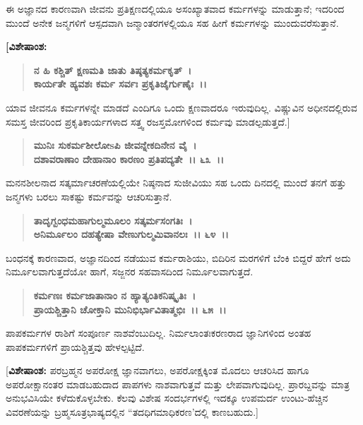 ಈ ಅಜ್ಞಾನದ ಕಾರಣವಾಗಿ ಜೀವನು ಪ್ರತಿಕ್ಷಣದಲ್ಲಿಯೂ ಅಸಂಖ್ಯಾತವಾದ ಕರ್ಮಗಳನ್ನು ಮಾಡುತ್ತಾನೆ; ಇದರಿಂದ ಮುಂದೆ ಅನೇಕ ಜನ್ಮಗಳಿಗೆ ಆಸ್ಪದವಾಗಿ ಜನ್ಮಾಂತರಗಳಲ್ಲಿಯೂ ಸಹ ಹೀಗೆ ಕರ್ಮಗಳನ್ನು ಮುಂದುವರೆಸುತ್ತಾನೆ.

\begin{flushleft}
\textbf{[ವಿಶೇಷಾಂಶ:}
\end{flushleft}

\begin{verse}
\textbf{ನ ಹಿ ಕಶ್ಚಿತ್ ಕ್ಷಣಮತಿ ಜಾತು ತಿಷ್ಠತ್ಯಕರ್ಮಕೃತ್~।}\\\textbf{ಕಾರ್ಯತೇ ಹ್ಯವಶಃ ಕರ್ಮ ಸರ್ವಃ ಪ್ರಕೃತಿಜೈರ್ಗುಣೈಃ~।।}  
\end{verse}

ಯಾವ ಜೀವನೂ ಕರ್ಮಗಳನ್ನೇ ಮಾಡದೆ ಎಂದಿಗೂ ಒಂದು ಕ್ಷಣವಾದರೂ ಇರುವುದಿಲ್ಲ. ವಿಷ್ಣುವಿನ ಅಧೀನದಲ್ಲಿರುವ ಸಮಸ್ತ ಜೀವರಿಂದ ಪ್ರಕೃತಿಕಾರ್ಯಗಳಾದ ಸತ್ತ್ವ ರಜಸ್ತಮೋಗಳಿಂದ ಕರ್ಮವು ಮಾಡಲ್ಪಡುತ್ತದೆ.]

\begin{verse}
\textbf{ಮುನಿಃ ಸುಕರ್ಮಶೀಲೋsಪಿ ಜೀವನ್ನೇಕದಿನೇನ ವೈ~।}\\\textbf{ದಶಾವರಾಣಾಂ ದೇಹಾನಾಂ ಕಾರಣಂ ಪ್ರತಿಪದ್ಯತೇ~।। ೬೩~।।}
\end{verse}

ಮನನಶೀಲನಾದ ಸತ್ಕರ್ಮಾಚರಣೆಯಲ್ಲಿಯೇ ನಿಷ್ಠನಾದ ಸುಜೀವಿಯು ಸಹ ಒಂದು ದಿನದಲ್ಲಿ ಮುಂದೆ ತನಗೆ ಹತ್ತು ಜನ್ಮಗಳು ಬರಲು ಸಾಕಷ್ಟು ಕರ್ಮವನ್ನು ಆಚರಿಸುತ್ತಾನೆ.

\begin{verse}
\textbf{ತಾದೃಗ್ಬಂಧಮಹಾಗುಲ್ಮಮೂಲಂ ಸತ್ಕರ್ಮಸಂಗತಿಃ~।}\\\textbf{ಅನಿರ್ಮೂಲಂ ದಹತ್ಯೇಷಾ ವೇಣುಗುಲ್ಮಮಿವಾನಲಃ~।। ೬೪~।।}
\end{verse}

ಬಂಧನಕ್ಕೆ ಕಾರಣವಾದ, ಅಜ್ಞಾನದಿಂದ ನಡೆಯುವ ಕರ್ಮರಾಶಿಯು, ಬಿದಿರಿನ ಮರಗಳಿಗೆ ಬೆಂಕಿ ಬಿದ್ದರೆ ಹೇಗೆ ಅದು ನಿರ್ಮೂಲವಾಗುತ್ತದೆಯೋ ಹಾಗೆ, ಸಜ್ಜನರ ಸಹವಾಸದಿಂದ ನಿರ್ಮೂಲವಾಗುತ್ತದೆ.

\begin{verse}
\textbf{ಕರ್ಮಣಃ ಕರ್ಮಜಾತಾನಾಂ ನ ಹ್ಯಾತ್ಯಂತಿಕನಿಷ್ಕೃತಿಃ~।}\\\textbf{ಪ್ರಾಯಶ್ಚಿತ್ತಾನಿ ಚೋಕ್ತಾನಿ ಮುನಿಭಿರ್ಭಾವಿತಾತ್ಮಭಿಃ~।। ೬೫~।।}
\end{verse}

ಪಾಪಕರ್ಮಗಳ ರಾಶಿಗೆ ಸಂಪೂರ್ಣ ನಾಶವೆಂಬುದಿಲ್ಲ. ನಿರ್ಮಲಾಂತಃಕರಣರಾದ ಜ್ಞಾನಿಗಳಿಂದ ಅಂತಹ ಪಾಪಕರ್ಮಗಳಿಗೆ ಪ್ರಾಯಶ್ಚಿತ್ತವು ಹೇಳಲ್ಪಟ್ಟಿದೆ.

[\textbf{ವಿಶೇಷಾಂಶ:} ಪರಬ್ರಹ್ಮನ ಅಪರೋಕ್ಷ ಜ್ಞಾನವಾಗಲು, ಅಪರೋಕ್ಷಕ್ಕಿಂತ ಮೊದಲು ಆಚರಿಸಿದ ಹಾಗೂ ಅಪರೋಕ್ಷಾನಂತರ ಮಾಡಬಹುದಾದ ಪಾಪಗಳು ನಾಶವಾಗುತ್ತವೆ ಮತ್ತು ಲೇಪವಾಗುವುದಿಲ್ಲ. ಪ್ರಾರಬ್ದವನ್ನು ಮಾತ್ರ ಅನುಭವಿಸಿಯೇ ಕಳೆದುಕೊಳ್ಳಬೇಕು. ಕೆಲವು ವಿಶೇಷ ಸಂದರ್ಭಗಳಲ್ಲಿ ಇದಕ್ಕೂ ಉಪಮರ್ದ ಉಂಟು-ಹೆಚ್ಚಿನ ವಿವರಣೆಯನ್ನು ಬ್ರಹ್ಮಸೂತ್ರಭಾಷ್ಯದಲ್ಲಿನ “ತದಧಿಗಮಾಧಿಕರಣ'ದಲ್ಲಿ ಕಾಣಬಹುದು.]

